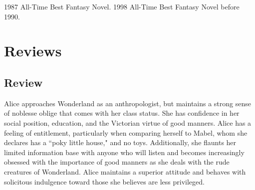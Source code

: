 \documentclass[a4]{resume} %
\begin{document}
\begin{sidebarshortlist}
  \sidebarshortlistitem
    {1987}
    {All-Time Best Fantasy Novel.}
  \sidebarshortlistitem
    {1998}
    {All-Time Best Fantasy Novel before 1990.}
\end{sidebarshortlist}


%
%
%

\newpage %

\makeprofile %

\section{\bfseries{Reviews}}

\subsection{Review}

Alice approaches Wonderland as an anthropologist, but maintains a strong sense of noblesse oblige that comes with her class status. She has confidence in her social position, education, and the Victorian virtue of good manners. Alice has a feeling of entitlement, particularly when comparing herself to Mabel, whom she declares has a ``poky little house," and no toys. Additionally, she flaunts her limited information base with anyone who will listen and becomes increasingly obsessed with the importance of good manners as she deals with the rude creatures of Wonderland. Alice maintains a superior attitude and behaves with solicitous indulgence toward those she believes are less privileged.
\end{document}
